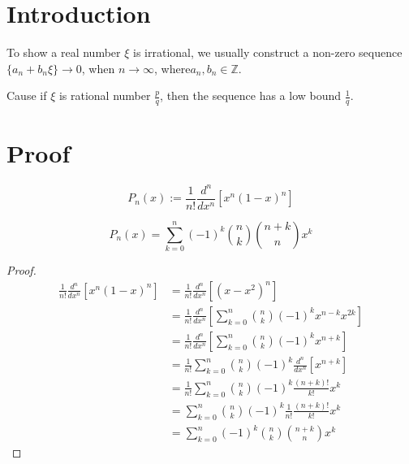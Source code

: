 %

\chapter{Introduction}

To show a real number $\xi$ is irrational, we usually construct a non-zero sequence 
$\{a_n + b_n\xi\} \rightarrow 0$, when $n \rightarrow \infty$, where$a_n, b_n \in \mathbb{Z}$.

Cause if $\xi$ is rational number $\frac{p}{q}$, then the sequence has a low bound $\frac{1}{q}$.

\chapter{Proof}

\begin{definition}\label{shiftedLegendre}
    \leanok
    \[ P_n(x):=\frac{1}{n!}\frac{d^n}{dx^n}[x^n(1-x)^n] \]
\end{definition}

\begin{lemma}\label{shiftedLegendre_eq_sum}
    \[ P_n(x)=\sum\limits_{k=0}^{n}(-1)^k\binom{n}{k}\binom{n+k}{n}x^k \]
\end{lemma}
\begin{proof}
    \leanok
    \begin{align*}
        \frac{1}{n!}\frac{d^n}{dx^n}[x^n(1-x)^n] &= \frac{1}{n!}\frac{d^n}{dx^n}[(x-x^2)^n]\\
        &= \frac{1}{n!}\frac{d^n}{dx^n}[\sum\limits_{k=0}^{n} \binom{n}{k}(-1)^k x^{n-k}x^{2k}]\\
        &= \frac{1}{n!}\frac{d^n}{dx^n}[\sum\limits_{k=0}^{n} \binom{n}{k}(-1)^k x^{n+k}]\\
        &= \frac{1}{n!}\sum\limits_{k=0}^{n} \binom{n}{k}(-1)^k \frac{d^n}{dx^n}[x^{n+k}]\\
        &= \frac{1}{n!}\sum\limits_{k=0}^{n} \binom{n}{k}(-1)^k \frac{(n+k)!}{k!}x^{k}\\
        &= \sum\limits_{k=0}^{n} \binom{n}{k}(-1)^k \frac{1}{n!}\frac{(n+k)!}{k!}x^{k}\\
        &= \sum\limits_{k=0}^{n} (-1)^k \binom{n}{k}\binom{n+k}{n}x^{k}
    \end{align*}
\end{proof}

